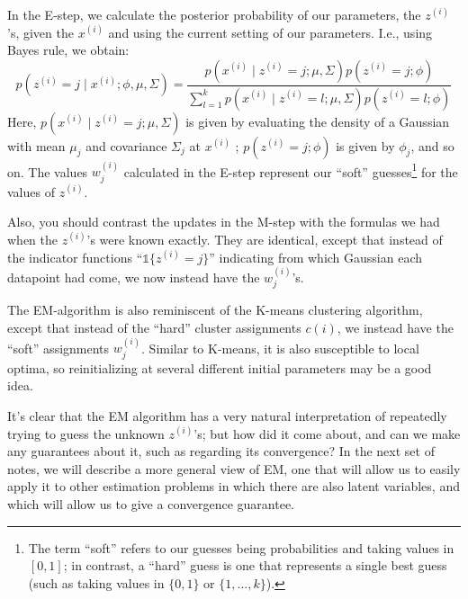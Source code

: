 In the E-step, we calculate the posterior probability of our parameters, the $z^{(i)}$'s, %
given the $x^{(i)}$ and using the current setting of our parameters. I.e.,
using Bayes rule, we obtain:
\begin{equation*}
    p(z^{(i)} = j \mid x^{(i)} ;\phi,\mu,\Sigma) = \frac{p(x^{(i)} \mid z^{(i)} = j;\mu,\Sigma)p(z^{(i)} = j;\phi)}{\sum^k_{l=1} p(x^{(i)} \mid z^{(i)} = l;\mu,\Sigma)p(z^{(i)} = l;\phi)}
\end{equation*}
Here, $p(x^{(i)} \mid z^{(i)} = j;\mu,\Sigma)$ is given by evaluating the density of a Gaussian
with mean $\mu_j$ and covariance $\Sigma_j$ at $x^{(i)}$ ; $p(z^{(i)} = j;\phi)$ is given by $\phi_j$, and so
on. The values $w^{(i)}_j$ calculated in the E-step represent our ``soft'' guesses\footnote{
The term ``soft'' refers to our guesses being probabilities and taking values in $[0,1]$; in
contrast, a ``hard'' guess is one that represents a single best guess (such as taking values
in $\{0,1\}$ or $\{1,\ldots,k\}$).} for the values of $z^{(i)}$.

Also, you should contrast the updates in the M-step with the formulas we
had when the $z^{(i)}$'s were known exactly. They are identical, except that instead
of the indicator functions ``$\mathbb{1}\{z^{(i)} = j\}$'' indicating from which Gaussian
each datapoint had come, we now instead have the $w^{(i)}_j$'s.

The EM-algorithm is also reminiscent of the K-means clustering algorithm,
except that instead of the ``hard'' cluster assignments $c(i)$, we instead
have the ``soft'' assignments $w^{(i)}_j$. Similar to K-means, it is also susceptible
to local optima, so reinitializing at several different initial parameters may
be a good idea.

It's clear that the EM algorithm has a very natural interpretation of
repeatedly trying to guess the unknown $z^{(i)}$'s; but how did it come about,
and can we make any guarantees about it, such as regarding its convergence?
In the next set of notes, we will describe a more general view of EM, one
that will allow us to easily apply it to other estimation problems in which
there are also latent variables, and which will allow us to give a convergence
guarantee.
